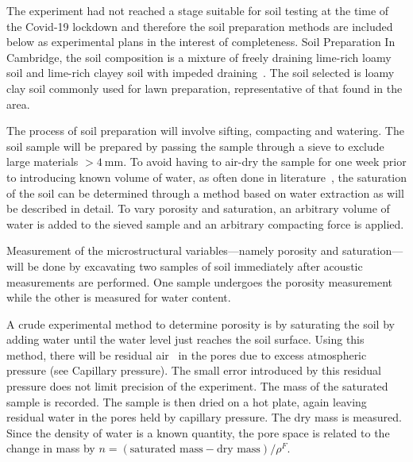 \documentclass[twocolumn]{article}
\begin{document}
The experiment had not reached a stage suitable for soil testing at the time of the Covid-19 lockdown and therefore the soil preparation methods are included below as experimental plans in the interest of completeness.
Soil Preparation
In Cambridge, the soil composition is a mixture of freely draining lime-rich loamy soil and lime-rich clayey soil with impeded draining~\cite{landis_2004,rhs_gardening_2009}. The soil selected is loamy clay soil commonly used for lawn preparation, representative of that found in the area.

The process of soil preparation will involve sifting, compacting and watering. The soil sample will be prepared by passing the sample through a sieve to exclude large materials $> \SI{4}{\milli\m}$. To avoid having to air-dry the sample for one week prior to introducing known volume of water, as often done in literature~\cite{brien_darmody_2002}, the saturation of the soil can be determined through a method based on water extraction as will be described in detail. To vary porosity and saturation, an arbitrary volume of water is added to the sieved sample and an arbitrary compacting force is applied.

Measurement of the microstructural variables---namely porosity and saturation---will be done by excavating two samples of soil immediately after acoustic measurements are performed. One sample undergoes the porosity measurement while the other is measured for water content.

A crude experimental method to determine porosity is by saturating the soil by adding water until the water level just reaches the soil surface. Using this method, there will be residual air~\cite{adamski_kremesec_charbeneau_2005} in the pores due to excess atmospheric pressure (see Capillary pressure). The small error introduced by this residual pressure does not limit precision of the experiment. The mass of the saturated sample is recorded. The sample is then dried on a hot plate, again leaving residual water in the pores held by capillary pressure. The dry mass is measured. Since the density of water is a known quantity, the pore space is related to the change in mass by $n = (\text{saturated mass} - \text{dry mass}) / \rho^F$.
\end{document}
